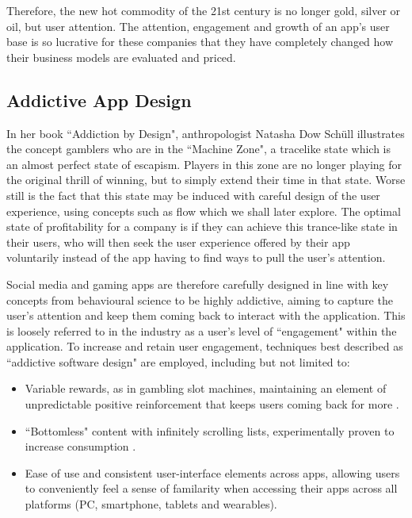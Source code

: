 Therefore, the new hot commodity of the 21st century is no longer gold, silver or oil, but user attention. The attention, engagement and growth of an app's user base is so lucrative for these companies that they have completely changed how their business models are evaluated and priced.

\subsection{Addictive App Design}
In her book ``Addiction by Design", anthropologist Natasha Dow Schüll \cite{schull2014addiction} illustrates the concept gamblers who are in the ``Machine Zone", a tracelike state which is an almost perfect state of escapism. Players in this zone are no longer playing for the original thrill of winning, but to simply extend their time in that state. Worse still is the fact that this state may be induced with careful design of the user experience, using concepts such as flow\cite{csikszentmihalyi1990flow} which we shall later explore. The optimal state of profitability for a company is if they can achieve this trance-like state in their users, who will then seek the user experience offered by their app voluntarily instead of the app having to find ways to pull the user's attention.

Social media and gaming apps are therefore carefully designed in line with key concepts from behavioural science to be highly addictive, aiming to capture the user's attention and keep them coming back to interact with the application. This is loosely referred to in the industry as a user's level of ``engagement" within the application. To increase and retain user engagement, techniques best described as ``addictive software design" \cite{neyman2017survey} are employed, including but not limited to:

\begin{itemize}
    \item Variable rewards, as in gambling slot machines, maintaining an element of unpredictable positive reinforcement that keeps users coming back for more \cite{neyman2017survey}.
    \item ``Bottomless" content with infinitely scrolling lists, experimentally proven to increase consumption \cite{neyman2017survey}.
    \item Ease of use and consistent user-interface elements across apps, allowing users to conveniently feel a sense of familarity when accessing their apps across all platforms (PC, smartphone, tablets and wearables).
\end{itemize}

